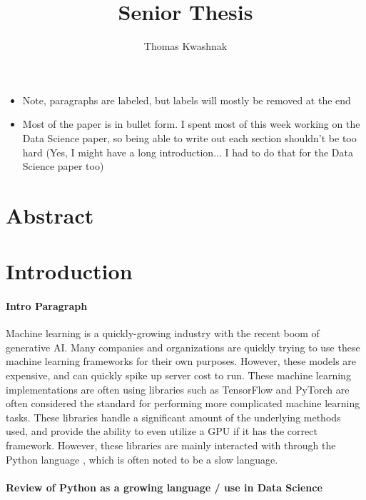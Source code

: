 \documentclass[12pt]{article}
\author{Thomas Kwashnak}
\title{Senior Thesis}
\begin{document}
\maketitle

\newpage


\begin{itemize}
	\item Note, paragraphs are labeled, but labels will mostly be removed at the end
	\item Most of the paper is in bullet form. I spent most of this week working on the Data Science paper, so being able to write out each section shouldn't be too hard (Yes, I might have a long introduction... I had to do that for the Data Science paper too)
\end{itemize}


\section{Abstract}

\section{Introduction}

\paragraph{Intro Paragraph}
Machine learning is a quickly-growing industry with the recent boom of generative AI.
Many companies and organizations are quickly trying to use these machine learning frameworks for their own purposes.
However, these models are expensive, and can quickly spike up server cost to run.
These machine learning implementations are often using libraries such as TensorFlow \cite{lib_tensorflow} and PyTorch \cite{lib_pytorch} are often considered the standard for performing more complicated machine learning tasks.
These libraries handle a significant amount of the underlying methods used, and provide the ability to even utilize a GPU if it has the correct framework.
However, these libraries are mainly interacted with through the Python language \cite{lang_python}, which is often noted to be a slow language.

\paragraph{Review of Python as a growing language / use in Data Science}
\end{document}
